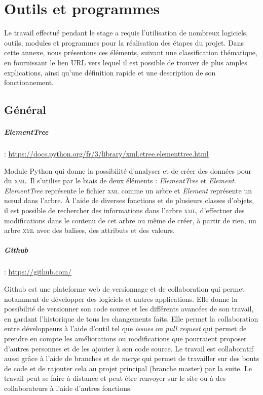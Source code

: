 \chapter{Outils et programmes}

Le travail effectué pendant le stage a requis l'utilisation de nombreux logiciels, outils, modules et programmes pour la réalisation des étapes du projet. Dans cette annexe, nous présentons ces éléments, suivant une classification thématique, en fournissant le lien URL vers lequel il est possible de trouver de plus amples explications, ainsi qu'une définition rapide et une description de son fonctionnement.

\section{Général}
\paragraph{ElementTree} : \url{https://docs.python.org/fr/3/library/xml.etree.elementtree.html}

Module Python qui donne la possibilité d'analyser et de créer des données pour du \textsc{xml}. Il s'utilise par le biais de deux éléments : \textit{ElementTree} et \textit{Element}. \textit{ElementTree} représente le fichier \textsc{xml} comme un arbre et \textit{Element} représente un nœud dans l'arbre. À l'aide de diverses fonctions et de plusieurs classes d'objets, il est possible de rechercher des informations dans l'arbre \textsc{xml}, d'effectuer des modifications dans le contenu de cet arbre ou même de créer, à partir de rien, un arbre \textsc{xml} avec des balises, des attributs et des valeurs.

\paragraph{Github} : \url{https://github.com/}

Github est une plateforme web de versionnage et de collaboration qui permet notamment de développer des logiciels et autres applications. Elle donne la possibilité de versionner son code source et les différents avancées de son travail, en gardant l'historique de tous les changements faits. Elle permet la collaboration entre développeurs à l'aide d'outil tel que \textit{issues} ou \textit{pull request} qui permet de prendre en compte les améliorations ou modifications que pourraient proposer d'autres personnes et de les ajouter à son code source. Le travail est collaboratif aussi grâce à l'aide de branches et de \textit{merge} qui permet de travailler sur des bouts de code et de rajouter cela au projet principal (branche master) par la suite. Le travail peut se faire à distance et peut être renvoyer sur le site ou à des collaborateurs à l'aide d'autres fonctions.

